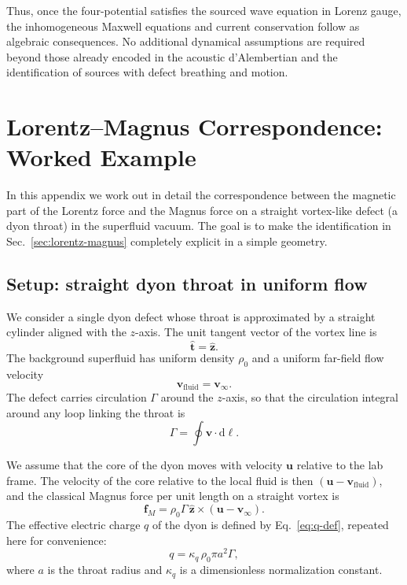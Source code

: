 \documentclass[11pt]{article}
\newcommand{\dd}{\mathrm{d}}
\newcommand{\vfluid}{\mathbf{v}_{\mathrm{fluid}}}
\begin{document}
Thus, once the four-potential satisfies the sourced wave equation in Lorenz gauge, the inhomogeneous Maxwell equations and current conservation follow as algebraic consequences.  No additional dynamical assumptions are required beyond those already encoded in the acoustic d'Alembertian and the identification of sources with defect breathing and motion.

\section{Lorentz--Magnus Correspondence: Worked Example}
\label{app:lorentz-magnus}

In this appendix we work out in detail the correspondence between the magnetic part of the Lorentz force and the Magnus force on a straight vortex-like defect (a dyon throat) in the superfluid vacuum.  The goal is to make the identification in Sec.~\ref{sec:lorentz-magnus} completely explicit in a simple geometry.

\subsection{Setup: straight dyon throat in uniform flow}

We consider a single dyon defect whose throat is approximated by a straight cylinder aligned with the $z$-axis.  The unit tangent vector of the vortex line is
\begin{equation}
\hat{\mathbf{t}} = \hat{\mathbf{z}}.
\end{equation}
The background superfluid has uniform density $\rho_0$ and a uniform far-field flow velocity
\begin{equation}
\vfluid = \mathbf{v}_\infty.
\end{equation}
The defect carries circulation $\Gamma$ around the $z$-axis, so that the circulation integral around any loop linking the throat is
\begin{equation}
\Gamma = \oint \mathbf{v}\cdot\dd\boldsymbol{\ell}.
\end{equation}

We assume that the core of the dyon moves with velocity $\mathbf{u}$ relative to the lab frame.  The velocity of the core relative to the local fluid is then $(\mathbf{u}-\vfluid)$, and the classical Magnus force per unit length on a straight vortex is
\begin{equation}
\mathbf{f}_M
= \rho_0 \Gamma\,\hat{\mathbf{z}} \times (\mathbf{u} - \mathbf{v}_\infty).
\label{eq:app-Magnus}
\end{equation}
The effective electric charge $q$ of the dyon is defined by Eq.~\eqref{eq:q-def}, repeated here for convenience:
\begin{equation}
q = \kappa_q\,\rho_0 \pi a^2 \Gamma,
\label{eq:app-q-def}
\end{equation}
where $a$ is the throat radius and $\kappa_q$ is a dimensionless normalization constant.
\end{document}
